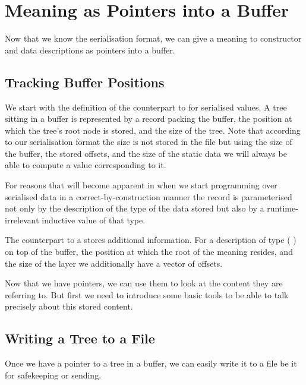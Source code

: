 \section{Meaning as Pointers into a Buffer}\label{sec:pointers}

Now that we know the serialisation format, we can give a meaning
to constructor and data descriptions as pointers into a buffer.

\subsection{Tracking Buffer Positions}

We start with the definition of the counterpart to 
for serialised values. A tree sitting in a buffer is represented
by a record packing the buffer, the position at which the tree's
root node is stored, and the size of the tree.
%
Note that according to our serialisation format the size is not stored
in the file but using the size of the buffer, the stored offsets,
and the size of the static data we will always
be able to compute a value corresponding to it.


For reasons that will become apparent in 
when we start programming over serialised data in a correct-by-construction
manner the record  is parameterised not only by the description
of the type of the data stored but also by a runtime-irrelevant inductive value of
that type.


The counterpart to a  stores additional information.
For a description of type (   )
on top of the buffer, the position at which the root of the meaning resides,
and the size of the layer we additionally have a vector of  offsets.

Now that we have pointers, we can use them to look at the content
they are referring to. But first we need to introduce some basic tools
to be able to talk precisely about this stored content.

\subsection{Writing a Tree to a File}\label{sec:writetofile}

Once we have a pointer to a tree in a buffer, we can easily write it to a
file be it for safekeeping or sending.

